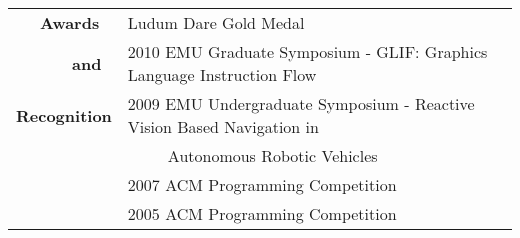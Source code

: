 \documentclass[10pt,a4paper]{article}
\begin{document}
\begin{tabular}{  p{} p{} }
\ \ \ \textbf{\large Awards} &  Ludum Dare Gold Medal \\
\ \ \ \ \ \ \ \textbf{\large and}& 2010 EMU Graduate Symposium - GLIF: Graphics Language Instruction Flow\\
\textbf{\large Recognition} & 2009 EMU Undergraduate Symposium - Reactive Vision Based Navigation in \\
\ & \ \ \ \ \  Autonomous Robotic Vehicles \\
\ &  2007 ACM Programming Competition \\
\ & 2005 ACM Programming Competition \\
\end{tabular}
\end{document}
